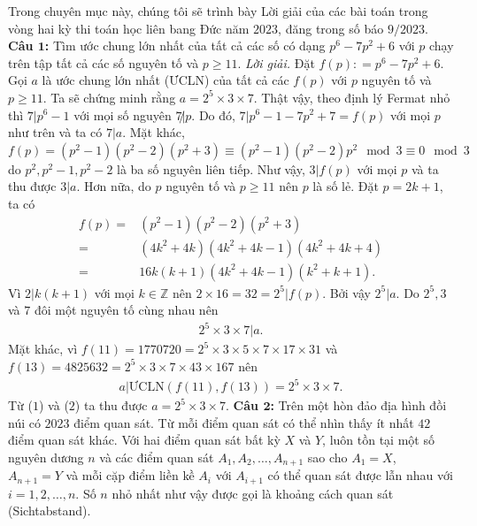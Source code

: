 \begin{multicols}{2}
	Trong chuyên mục này, chúng tôi sẽ trình bày Lời giải của các bài toán trong vòng hai kỳ thi toán học liên bang Đức năm $2023$, đăng trong số báo $9/2023$. 
	\vskip 0.1cm
	\textbf{\color{cackithi}Câu $\pmb{1}$:} Tìm ước chung lớn nhất của tất cả các số có dạng $p^6 - 7p^2 +6$ với $p$ chạy trên tập tất cả các số nguyên tố và $p \ge 11$.
	\vskip 0.1cm
	\textit{Lời giải.}
	Đặt $f(p) \colon =p^6 - 7p^2 +6$. Gọi $a$ là ước chung lớn nhất (ƯCLN) của tất cả các $f(p)$ với $p$ nguyên tố và $p \ge 11$. Ta sẽ chứng minh rằng $a = 2^5\times 3 \times 7$.
	\vskip 0.1cm	
	Thật vậy, theo định lý Fermat nhỏ thì $7|p^6 - 1$ với mọi số nguyên $7 \not | p$. Do đó, $7 |p^6 - 1  - 7p^2 + 7 = f(p)$ với mọi $p$ như trên và ta có $7 | a$.
	\vskip 0.1cm	
	Mặt khác, 
	$f(p) = (p^2-1)(p^2-2)(p^2+3) \equiv (p^2-1)(p^2-2)p^2 \mod 3 \equiv 0 \mod 3$ do $p^2, p^2-1, p^2-2$ là ba số nguyên liên tiếp. Như vậy, $3 | f(p)$ với mọi $p$ và ta thu được $3|a$.
	\vskip 0.1cm	
	Hơn nữa, do $p$ nguyên tố và $p \ge 11$ nên $p$ là số lẻ. Đặt $p= 2k+1$, ta có
	\begin{align*}
			f(p) = & (p^2-1)(p^2-2)(p^2+3) \\
			= & (4k^2 \!+\! 4k) \!(4k^2 \!+\! 4k\!-\!1)(4k^2\!+\!4k\!+\!4) \\
			= & 16k(k\!+\!1)(4k^2 \!+\! 4k\!-\!1)(k^2 \!+\! k \!+\! 1).
	\end{align*}
	Vì $2 |k(k+1)$ với mọi $k \in \mathbb{Z}$ nên $2\times 16 = 32 = 2^5 |f(p)$. Bởi vậy $2^5 |a$.
	\vskip 0.1cm
	Do $2^5, 3$ và $7$ đôi một nguyên tố cùng nhau nên
	\begin{align*}
		2^5 \times 3 \times 7 |a. \tag{$1$}
	\end{align*}
		Mặt khác, vì
		$
		f(11) = 1770720 = 2^5 \times 3 \times 5 \times 7 \times 17 \times 31
		$
		và
		$
		f(13) = 4825632 = 2^5 \times 3 \times 7 \times 43 \times 167
		$
		nên 
		\begin{align*}
			a |\text{ƯCLN}(f(11), f(13)) \!=\! 2^5\!\times\! 3 \!\times\! 7. \tag{$2$}
		\end{align*}
		Từ ($1$) và ($2$) ta thu được $a = 2^5\times 3 \times 7$.
	\vskip 0.1cm
	\textbf{\color{cackithi}Câu $\pmb{2}$:} Trên một hòn đảo địa hình đồi núi có $2023$ điểm quan sát. Từ mỗi điểm quan sát có thể nhìn thấy ít nhất $42$ điểm quan sát khác. Với hai điểm quan sát bất kỳ $X$ và $Y$, luôn tồn tại một số nguyên dương $n$ và các điểm quan sát $A_1,  A_2, \ldots, A_{n+1}$ sao cho $A_1 = X$, $A_{n+1} = Y$ và mỗi cặp điểm liền kề $A_i$ với $A_{i+1}$ có thể quan sát được lẫn nhau với $i = 1, 2, \ldots, n$. Số $n$ nhỏ nhất như vậy được gọi là khoảng cách quan sát (Sichtabstand). 

\end{multicols}
